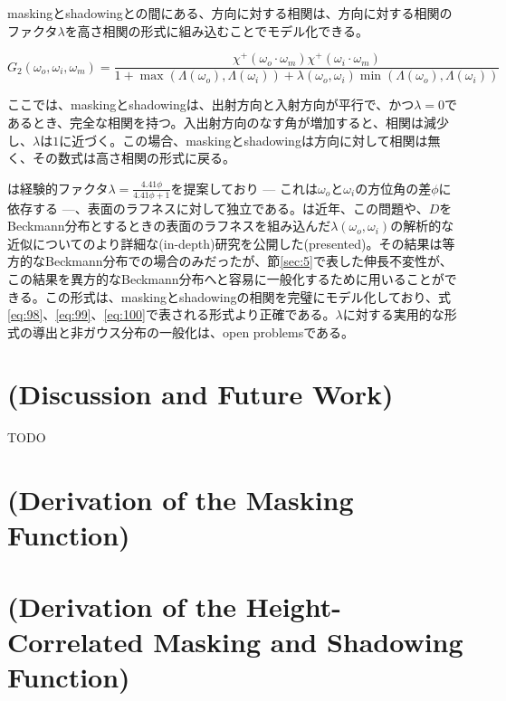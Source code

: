 \documentclass[a4j,xelatex,ja=standard]{bxjsarticle}
\begin{document}
maskingとshadowingとの間にある、方向に対する相関は、方向に対する相関のファクタ$\lambda$を高さ相関の形式に組み込むことでモデル化できる。

\begin{equation}
    G_2(\omega_o, \omega_i, \omega_m) = \frac{\chi^+(\omega_o \cdot \omega_m) \chi^+(\omega_i \cdot \omega_m)}{1 + \max(\Lambda(\omega_o), \Lambda(\omega_i)) + \lambda(\omega_o, \omega_i) \min(\Lambda(\omega_o), \Lambda(\omega_i))}
    \label{eq:101}
\end{equation}

ここでは、maskingとshadowingは、出射方向と入射方向が平行で、かつ$\lambda = 0$であるとき、完全な相関を持つ。入出射方向のなす角が増加すると、相関は減少し、$\lambda$は$1$に近づく。この場合、maskingとshadowingは方向に対して相関は無く、その数式は高さ相関の形式に戻る。

\citeauthor{Ginneken1998} \cite{Ginneken1998}は経験的ファクタ$\lambda = \frac{4.41\phi}{4.41\phi + 1}$を提案しており --- これは$\omega_o$と$\omega_i$の方位角の差$\phi$に依存する ---、表面のラフネスに対して独立である。\citeauthor{Heitz2013}は近年、この問題や、$D$をBeckmann分布とするときの表面のラフネスを組み込んだ$\lambda(\omega_o, \omega_i)$の解析的な近似についてのより詳細な(in-depth)研究を公開した(presented)\cite{Heitz2013}。その結果は等方的なBeckmann分布での場合のみだったが、節\ref{sec:5}で表した伸長不変性が、この結果を異方的なBeckmann分布へと容易に一般化するために用いることができる。この形式は、maskingとshadowingの相関を完璧にモデル化しており、式\eqref{eq:98}、\eqref{eq:99}、\eqref{eq:100}で表される形式より正確である。$\lambda$に対する実用的な形式の導出と非ガウス分布の一般化は、open problemsである。

\section{(Discussion and Future Work)}

TODO

\printbibliography[title=参考文献]

\appendix

\section{(Derivation of the Masking Function)}
\label{sec:A}

\section{(Derivation of the Height-Correlated Masking and Shadowing Function)}
\label{sec:B}
\end{document}
